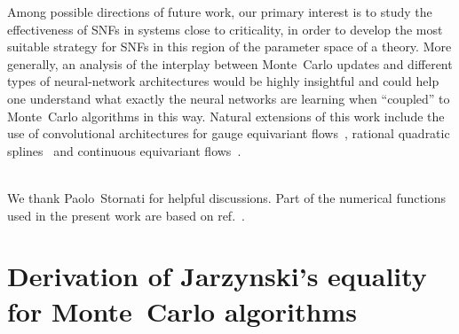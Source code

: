 \documentclass[11pt]{article}
\begin{document}
Among possible directions of future work, our primary interest is to study the effectiveness of SNFs in systems close to criticality, in order to develop the most suitable strategy for SNFs in this region of the parameter space of a theory. More generally, an analysis of the interplay between Monte~Carlo updates and different types of neural-network architectures would be highly insightful and could help one understand what exactly the neural networks are learning when ``coupled'' to Monte~Carlo algorithms in this way. Natural extensions of this work include the use of convolutional architectures for gauge equivariant flows~\cite{Kanwar:2020xzo, Boyda:2020hsi}, rational quadratic splines~\cite{DelDebbio:2021qwf} and continuous equivariant flows~\cite{deHaan:2021erb}.

\vskip1.0cm 
\\

We thank Paolo~Stornati for helpful discussions. Part of the numerical functions used in the present work are based on ref.~\cite{Albergo:2021vyo}.

\appendix

\section{Derivation of Jarzynski's equality for Monte~Carlo algorithms}
\label{sec:jarzynski_derivation}
\renewcommand{\theequation}{A.\arabic{equation}}
\setcounter{equation}{0}
\end{document}
